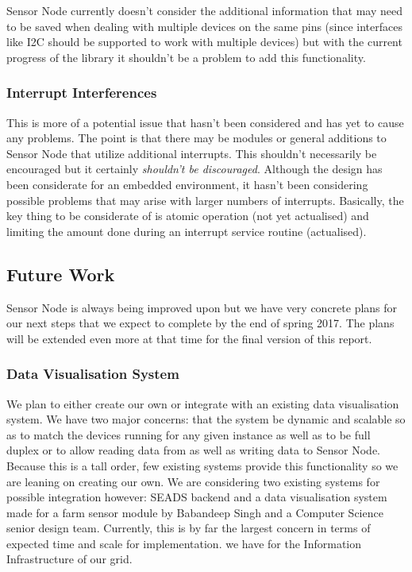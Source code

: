 \documentclass{article}
\begin{document}
Sensor Node currently doesn't consider the additional information that may need to be saved when dealing with multiple devices on the same pins (since interfaces like I2C should be supported to work with multiple devices) but with the current progress of the library it shouldn't be a problem to add this functionality.

\subsubsection{Interrupt Interferences}

This is more of a potential issue that hasn't been considered and has yet to cause any problems. The point is that there may be modules or general additions to Sensor Node that utilize additional interrupts. This shouldn't necessarily be encouraged but it certainly \textit{shouldn't be discouraged}. Although the design has been considerate for an embedded environment, it hasn't been considering possible problems that may arise with larger numbers of interrupts. Basically, the key thing to be considerate of is atomic operation (not yet actualised) and limiting the amount done during an interrupt service routine (actualised).

\subsection{Future Work}
\label{subsec:sensor_node_future_work}

Sensor Node is always being improved upon but we have very concrete plans for our next steps that we expect to complete by the end of spring 2017. The plans will be extended even more at that time for the final version of this report.

\subsubsection{Data Visualisation System}
\label{subsubsec:sensor_node_data_visualisation}

We plan to either create our own or integrate with an existing data visualisation system. We have two major concerns: that the system be dynamic and scalable so as to match the devices running for any given instance as well as to be full duplex or to allow reading data from as well as writing data to Sensor Node. Because this is a tall order, few existing systems provide this functionality so we are leaning on creating our own. We are considering two existing systems for possible integration however: SEADS backend and a data visualisation system made for a farm sensor module by Babandeep Singh and a Computer Science senior design team. Currently, this is by far the largest concern in terms of expected time and scale for implementation. we have for the Information Infrastructure of our grid.
\end{document}
